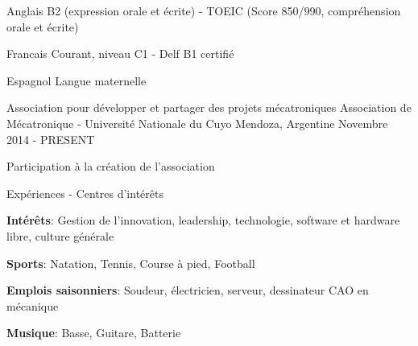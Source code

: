 

\begin{cvskills}
	
	\cvskill
	{Anglais} %
	{B2 (expression orale et écrite) - TOEIC (Score 850/990, compréhension orale et écrite)} %
	
	\cvskill
	{Francais} %
	{Courant, niveau C1 - Delf B1 certifié} %
	
	\cvskill
	{Espagnol} %
	{Langue maternelle } %
	
	
\end{cvskills}



\begin{cventries}
	
	\cventry
	{Association  pour développer et partager des projets mécatroniques} %
	{Association de Mécatronique - Université Nationale du Cuyo} %
	{Mendoza, Argentine} %
	{Novembre 2014 - PRESENT} %
	{
		\begin{cvitems} %
			\item {Participation à la création de l'association}
		\end{cvitems}
	}
	\cventry
	{} %
	{Expériences - Centres d’intérêts} %
	{} %
	{} %
	{
		\begin{cvitems} %
			\item {\textbf{Intérêts}:  Gestion de l'innovation, leadership, technologie, software et hardware libre, culture générale}
			\item {\textbf{Sports}: Natation, Tennis, Course à pied, Football}
			\item {\textbf{Emplois saisonniers}: Soudeur, électricien, serveur, dessinateur CAO en mécanique }
			\item {\textbf{Musique}: Basse, Guitare, Batterie}
		\end{cvitems}
	}		
\end{cventries}
